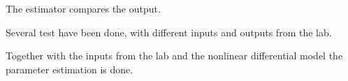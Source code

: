 The estimator compares the output. 

Several test have been done, with different inputs and outputs from the lab.


\begin{figure}[H]
\centering
\resizebox{0.75\linewidth}{!}{}
% 
\label{systemdiagram}
\end{figure} 

\begin{figure}[H]
\centering
\resizebox{0.75\linewidth}{!}{}
% 
\label{systemdiagram}
\end{figure} 

Together with the inputs from the lab and the nonlinear differential model the parameter estimation is done. 


 